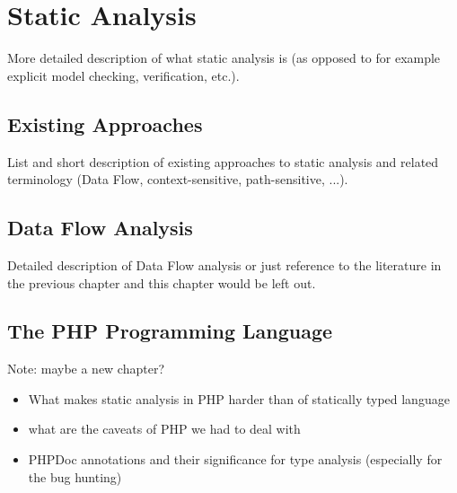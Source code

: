 \chapter{Static Analysis}

    More detailed description of what static analysis is (as opposed to for example explicit model checking, verification, etc.).
    
    \section{Existing Approaches}
    List and short description of existing approaches to static analysis and related terminology 
    (Data Flow, context-sensitive, path-sensitive, ...).
    
    \section{Data Flow Analysis}
    Detailed description of Data Flow analysis or just reference to the 
    literature in the previous chapter and this chapter would be left out.

    \section{The PHP Programming Language}
    Note: maybe a new chapter?
    
    \begin{itemize}
        \item[] What makes static analysis in PHP harder than of statically typed language
        \item[] what are the caveats of PHP we had to deal with
        \item[] PHPDoc annotations and their significance for type analysis (especially for the bug hunting)
    \end{itemize}